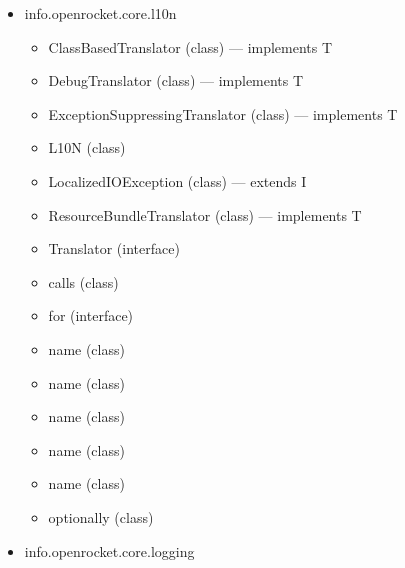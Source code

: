 \documentclass{amsdtx}
\begin{document}
\begin{itemize}
\begin{itemize}
    \begin{itemize}
    
    \item
      SimpleFileFilter (class) --- extends F
    \end{itemize}
  \item
    info.openrocket.core.l10n

    \begin{itemize}
    
    \item
      ClassBasedTranslator (class) --- implements T
    \item
      DebugTranslator (class) --- implements T
    \item
      ExceptionSuppressingTranslator (class) --- implements T
    \item
      L10N (class)
    \item
      LocalizedIOException (class) --- extends I
    \item
      ResourceBundleTranslator (class) --- implements T
    \item
      Translator (interface)
    \item
      calls (class)
    \item
      for (interface)
    \item
      name (class)
    \item
      name (class)
    \item
      name (class)
    \item
      name (class)
    \item
      name (class)
    \item
      optionally (class)
    \end{itemize}
  \item
    info.openrocket.core.logging

    \begin{itemize}
    

\end{itemize}
\end{itemize}
\end{itemize}
\end{document}
